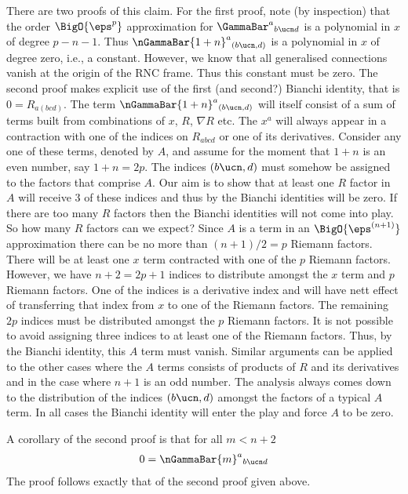\documentclass[12pt]{cdblatex}
\begin{document}
There are two proofs of this claim. For the first proof, note (by inspection) that the order $\BigO{\eps^p}$
approximation for $\GammaBar^{a}{}_{b\ucn d}$ is a polynomial in $x$ of degree $p-n-1$. Thus
$\nGammaBar{1+n}^{a}{}_{(b\ucn,d)}$ is a polynomial in $x$ of degree
zero, i.e., a constant. However, we know that all generalised connections vanish at the origin of the RNC frame.
Thus this constant must be zero. The second proof makes explicit use of the first (and second?) Bianchi identity,
that is $0=R_{a(bcd)}$. The term $\nGammaBar{1+n}^{a}{}_{(b\ucn,d)}$ will
itself consist of a sum of terms built from combinations of $x$, $R$, $\nabla R$ etc. The $x^{a}$ will always
appear in a contraction with one of the indices on $R_{abcd}$ or one of its derivatives. Consider any one of
these terms, denoted by $A$, and assume for the moment that $1+n$ is an even number, say $1+n=2p$. The indices
$(b\ucn,d)$ must somehow be assigned to the factors that comprise $A$. Our aim is to show that at least one $R$
factor in $A$ will receive 3 of these indices and thus by the Bianchi identities will be zero. If there are too
many $R$ factors then the Bianchi identities will not come into play. So how many $R$ factors can we expect?
Since $A$ is a term in an $\BigO{\eps^{(n+1)}}$ approximation there can be no more than $(n+1)/2=p$ Riemann
factors. There will be at least one $x$ term contracted with one of the $p$ Riemann factors. However, we have
$n+2=2p+1$ indices to distribute amongst the $x$ term and $p$ Riemann factors. One of the indices is a derivative
index and will have nett effect of transferring that index from $x$ to one of the Riemann factors. The remaining
$2p$ indices must be distributed amongst the $p$ Riemann factors. It is not possible to avoid assigning three
indices to at least one of the Riemann factors. Thus, by the Bianchi identity, this $A$ term must vanish. Similar
arguments can be applied to the other cases where the $A$ terms consists of products of $R$ and its derivatives
and in the case where $n+1$ is an odd number. The analysis always comes down to the distribution of the indices
$(b\ucn,d)$ amongst the factors of a typical $A$ term. In all cases the Bianchi identity will enter the play and
force $A$ to be zero.

A corollary of the second proof is that for all $m<n+2$
\begin{align}
   0 = \nGammaBar{m}^{a}{}_{b\ucn d}
\end{align}
The proof follows exactly that of the second proof given above.
\end{document}
